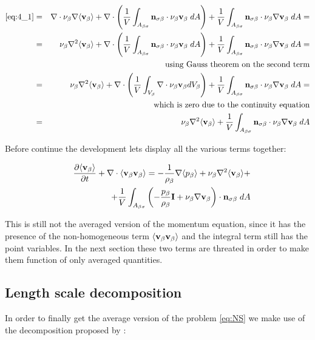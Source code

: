 \begin{eqnarray}
	\eqref{eq:4_1} &=& \nabla \cdot \nu_{\beta} \nabla {\left< \textbf{v}_{\beta}\right>} + \nabla \cdot \left( \dfrac{1}{V} \int_{A_{\beta \sigma}} \mathbf{n}_{\sigma \beta} \cdot \nu_{\beta} \textbf{v}_{\beta} \;dA \right) + \dfrac{1}{V} \int_{A_{\beta \sigma}} \mathbf{n}_{\sigma \beta} \cdot \nu_{\beta} \nabla \textbf{v}_{\beta} \;dA = \nonumber \\
	&=& \nu_{\beta}\nabla^2 {\left< \textbf{v}_{\beta} \right>} +  \nabla \cdot \left( \dfrac{1}{V} \int_{A_{\beta \sigma}} \mathbf{n}_{\sigma \beta} \cdot \nu_{\beta} \textbf{v}_{\beta} \;dA \right) + \dfrac{1}{V} \int_{A_{\beta \sigma}} \mathbf{n}_{\sigma \beta} \cdot \nu_{\beta} \nabla \textbf{v}_{\beta} \;dA  = \nonumber \\
	&& \text{using Gauss theorem on the second term} \nonumber \\
	&=& \nu_{\beta}\nabla^2 {\left< \textbf{v}_{\beta} \right>} +  \nabla \cdot \left( \dfrac{1}{V} \int_{V_\beta} \nabla \cdot \nu_{\beta} \textbf{v}_{\beta} dV_\beta \right) + \dfrac{1}{V} \int_{A_{\beta \sigma}} \mathbf{n}_{\sigma \beta} \cdot \nu_{\beta} \nabla \textbf{v}_{\beta} \;dA = \nonumber \\
	&& \text{which is zero due to the continuity equation} \nonumber \\
	&=& \nu_{\beta}\nabla^2 {\left< \textbf{v}_{\beta} \right>} + \dfrac{1}{V} \int_{A_{\beta \sigma}} \mathbf{n}_{\sigma \beta} \cdot \nu_{\beta} \nabla \textbf{v}_{\beta} \;dA
\end{eqnarray}


Before continue the development lets display all the various terms together:

\begin{eqnarray}
&& \dfrac{\partial {\left< \textbf{v}_{\beta}\right>}}{\partial t} + \nabla \cdot {\left< \textbf{v}_{\beta}\textbf{v}_{\beta}\right>} = -\dfrac{1}{\rho_{\beta}} \nabla {\left< p_{\beta}\right>} + \nu_{\beta}\nabla^2 {\left< \textbf{v}_{\beta} \right>} + \nonumber \\
&& +\dfrac{1}{V} \int_{A_{\beta \sigma}} \left( -\dfrac{p_{\beta}}{\rho_{\beta}} \mathbf{I} + \nu_{\beta} \nabla \textbf{v}_{\beta}  \right)\cdot \mathbf{n}_{\sigma \beta} \;dA \nonumber \\
\label{eq:mom_2}
\end{eqnarray}

This is still not the averaged version of the momentum equation, since it has the presence of the non-homogeneous term ${\left< \textbf{v}_{\beta}\textbf{v}_{\beta} \right>}$ and the integral term still has the point variables.
In the next section these two terms are threated in order to make them function of only averaged quantities.

\subsection{Length scale decomposition}
In order to finally get the average version of the problem \eqref{eq:NS} we make use of the decomposition proposed by \citet{gray1975derivation}:


